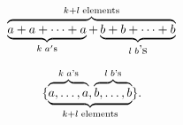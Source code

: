 $$
\overbrace{
  \underbrace{a+a+ \cdots +a}_{k\; a\rm 's} +
  \underbrace{b+b+ \cdots +b}_{l\; b\hbox{'s}}
}^{k+l\; \rm elements}
$$

$$\{\underbrace{\overbrace{\mathstrut a,\ldots,a}
^{k\;a\mathchar`'\rm s},
\overbrace{\mathstrut b,\ldots,b}
^{l\;b\mathchar`'\rm s}}_{k+l\rm\;elements}\}.$$


\bye


